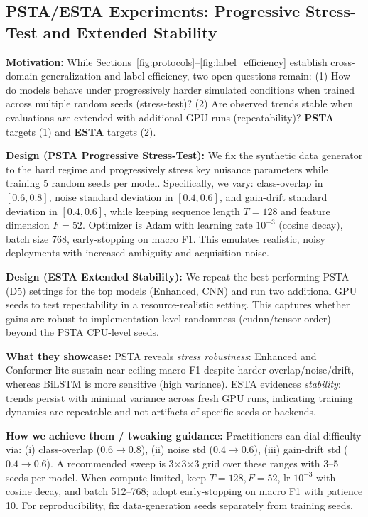 \documentclass[journal]{IEEEtran}
\begin{document}
\subsection{PSTA/ESTA Experiments: Progressive Stress-Test and Extended Stability}

\textbf{Motivation:} While Sections~\ref{fig:protocols}--\ref{fig:label_efficiency} establish cross-domain generalization and label-efficiency, two open questions remain: (1) How do models behave under progressively harder simulated conditions when trained across multiple random seeds (stress-test)? (2) Are observed trends stable when evaluations are extended with additional GPU runs (repeatability)? \textbf{PSTA} targets (1) and \textbf{ESTA} targets (2).

\textbf{Design (PSTA Progressive Stress-Test):} We fix the synthetic data generator to the hard regime and progressively stress key nuisance parameters while training 5 random seeds per model. Specifically, we vary: class-overlap in $[0.6,0.8]$, noise standard deviation in $[0.4,0.6]$, and gain-drift standard deviation in $[0.4,0.6]$, while keeping sequence length $T{=}128$ and feature dimension $F{=}52$. Optimizer is Adam with learning rate $10^{-3}$ (cosine decay), batch size 768, early-stopping on macro F1. This emulates realistic, noisy deployments with increased ambiguity and acquisition noise.

\textbf{Design (ESTA Extended Stability):} We repeat the best-performing PSTA (D5) settings for the top models (Enhanced, CNN) and run two additional GPU seeds to test repeatability in a resource-realistic setting. This captures whether gains are robust to implementation-level randomness (cudnn/tensor order) beyond the PSTA CPU-level seeds.

\textbf{What they showcase:} PSTA reveals \emph{stress robustness}: Enhanced and Conformer-lite sustain near-ceiling macro F1 despite harder overlap/noise/drift, whereas BiLSTM is more sensitive (high variance). ESTA evidences \emph{stability}: trends persist with minimal variance across fresh GPU runs, indicating training dynamics are repeatable and not artifacts of specific seeds or backends.

\textbf{How we achieve them / tweaking guidance:} Practitioners can dial difficulty via: (i) class-overlap ($0.6\rightarrow0.8$), (ii) noise std ($0.4\rightarrow0.6$), (iii) gain-drift std ($0.4\rightarrow0.6$). A recommended sweep is 3$\times$3$\times$3 grid over these ranges with 3--5 seeds per model. When compute-limited, keep $T{=}128,F{=}52$, lr $10^{-3}$ with cosine decay, and batch 512--768; adopt early-stopping on macro F1 with patience 10. For reproducibility, fix data-generation seeds separately from training seeds.
\end{document}
